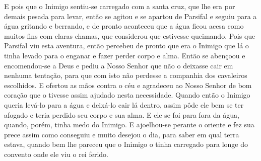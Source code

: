 E pois que o Inimigo sentiu-se carregado com a santa cruz, que lhe era por
demais pesada para levar, então se agitou e se apartou de Parsifal e seguiu
para a água gritando e berrando, e de pronto aconteceu que a água ficou acesa
como muitos fins com claras chamas, que considerou que estivesse queimando. 
Pois que Parsifal viu esta aventura, então percebeu de
pronto que era o Inimigo que lá o tinha levado para o enganar e fazer perder
corpo e alma. Então se abençoou e encomendou-se a Deus e pediu a Nosso Senhor
que não o deixasse cair em nenhuma tentação, para que com isto não perdesse a
companhia dos cavaleiros escolhidos. E ofertou as mãos contra o céu e agradeceu
ao Nosso Senhor de bom coração que o tivesse assim ajudado nesta necessidade.
Quando então o Inimigo queria levá-lo para a água e deixá-lo cair lá dentro,
assim pôde ele bem se ter afogado e teria perdido seu corpo e sua alma. E ele
se foi para fora da água, quando, porém, tinha medo do Inimigo. E ajoelhou-se
perante o oriente e fez sua prece assim como conseguiu e muito desejou o dia,
para saber em qual terra estava, quando bem lhe pareceu que o Inimigo o tinha
carregado para longe do convento onde ele viu o rei ferido. 

